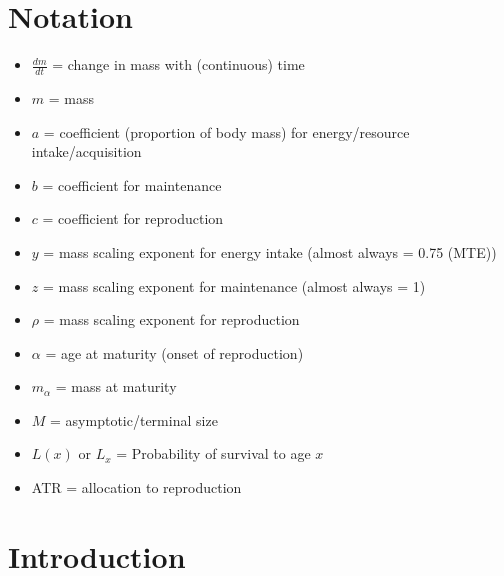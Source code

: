 \documentclass[a4paper]{article} %
\begin{document}
\newpage\section*{Notation}\thispagestyle{empty}
\begin{itemize}    
    \item $\frac{dm}{dt}$ = change in mass with (continuous) time
    \item $m$ = mass
    \item $a$ = coefficient (proportion of body mass) for energy/resource intake/acquisition
    \item $b$ = coefficient for maintenance
    \item $c$ = coefficient for reproduction
    \item $y$ = mass scaling exponent for energy intake (almost always = 0.75 (MTE))
    \item $z$ = mass scaling exponent for maintenance (almost always = 1)
    \item $\rho$ = mass scaling exponent for reproduction
    \item $\alpha$ = age at maturity (onset of reproduction)
    \item $m_{\alpha}$ = mass at maturity
    \item $M$ = asymptotic/terminal size
    \item $L(x)$ or $L_x$ = Probability of survival to age $x$
    \item ATR = allocation to reproduction
\end{itemize}

\vspace*{250px}
\section{Introduction}\thispagestyle{empty}
\end{document}
